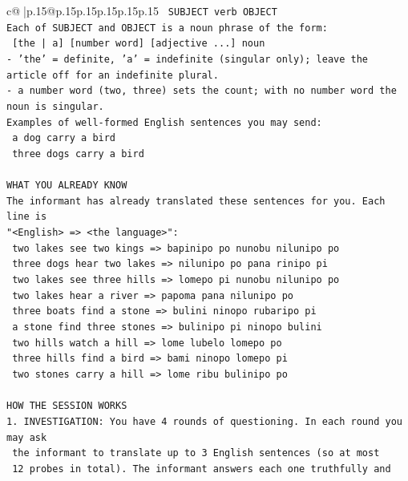 \documentclass{article}
\begin{document}
{\begin{supertabular}{c@{$\;$}|p{.15\linewidth}@{}p{.15\linewidth}p{.15\linewidth}p{.15\linewidth}p{.15\linewidth}p{.15\linewidth}}
{{{\texttt{    SUBJECT  verb  OBJECT} \\
\texttt{Each of SUBJECT and OBJECT is a noun phrase of the form:} \\
\texttt{    {[}the | a{]}  {[}number word{]}  {[}adjective ...{]}  noun} \\
\texttt{{-} 'the' = definite, 'a' = indefinite (singular only); leave the article off for an indefinite plural.} \\
\texttt{{-} a number word (two, three) sets the count; with no number word the noun is singular.} \\
\texttt{Examples of well{-}formed English sentences you may send:} \\
\texttt{    a dog carry a bird} \\
\texttt{    three dogs carry a bird} \\
\\ 
\texttt{WHAT YOU ALREADY KNOW} \\
\texttt{The informant has already translated these sentences for you. Each line is} \\
\texttt{"<English>  =>  <the language>":} \\
\texttt{    two lakes see two kings  =>  bapinipo po nunobu nilunipo po} \\
\texttt{    three dogs hear two lakes  =>  nilunipo po pana rinipo pi} \\
\texttt{    two lakes see three hills  =>  lomepo pi nunobu nilunipo po} \\
\texttt{    two lakes hear a river  =>  papoma pana nilunipo po} \\
\texttt{    three boats find a stone  =>  bulini ninopo rubaripo pi} \\
\texttt{    a stone find three stones  =>  bulinipo pi ninopo bulini} \\
\texttt{    two hills watch a hill  =>  lome lubelo lomepo po} \\
\texttt{    three hills find a bird  =>  bami ninopo lomepo pi} \\
\texttt{    two stones carry a hill  =>  lome ribu bulinipo po} \\
\\ 
\texttt{HOW THE SESSION WORKS} \\
\texttt{1. INVESTIGATION: You have 4 rounds of questioning. In each round you may ask} \\
\texttt{   the informant to translate up to 3 English sentences (so at most} \\
\texttt{   12 probes in total). The informant answers each one truthfully and} \\
}}}
\end{supertabular}}
\end{document}
